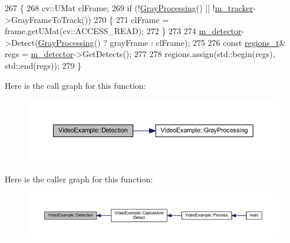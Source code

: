 \begin{DoxyCode}
267 \{
268     cv::UMat clFrame;
269     \textcolor{keywordflow}{if} (!\mbox{\hyperlink{class_video_example_af8ea44f17711129d2b954d1f01fee1f0}{GrayProcessing}}() || !\mbox{\hyperlink{class_video_example_a7c58cd8c883981b2e645d1a3d8edf76a}{m\_tracker}}->GrayFrameToTrack())
270     \{
271         clFrame = frame.getUMat(cv::ACCESS\_READ);
272     \}
273 
274     \mbox{\hyperlink{class_video_example_a00fee4b18b68d605b87051f3bdaa1c92}{m\_detector}}->Detect(\mbox{\hyperlink{class_video_example_af8ea44f17711129d2b954d1f01fee1f0}{GrayProcessing}}() ? grayFrame : clFrame);
275 
276     \textcolor{keyword}{const} \mbox{\hyperlink{defines_8h_a01db0de56a20f4342820a093c5154536}{regions\_t}}& regs = \mbox{\hyperlink{class_video_example_a00fee4b18b68d605b87051f3bdaa1c92}{m\_detector}}->GetDetects();
277 
278     regions.assign(std::begin(regs), std::end(regs));
279 \}
\end{DoxyCode}
Here is the call graph for this function\+:
\nopagebreak
\begin{figure}[H]
\begin{center}
\leavevmode
\includegraphics[width=350pt]{class_video_example_a5ea4a212997371399b01aed1d59a80b8_cgraph}
\end{center}
\end{figure}
Here is the caller graph for this function\+:
\nopagebreak
\begin{figure}[H]
\begin{center}
\leavevmode
\includegraphics[width=350pt]{class_video_example_a5ea4a212997371399b01aed1d59a80b8_icgraph}
\end{center}
\end{figure}
\mbox{\label{class_yolo_example_a1e5a542fbec653a1579ac6d5ed6dea4b}} 
